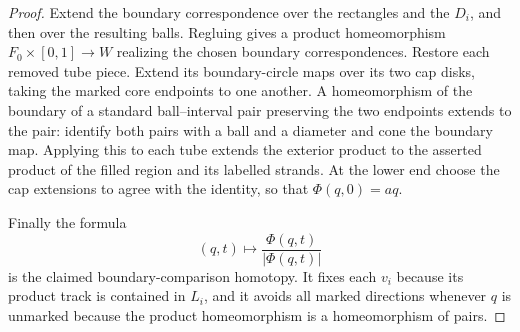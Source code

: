 \begin{proof}
Extend the boundary correspondence over the rectangles and the
$D_i$, and then over the resulting balls.  Regluing gives a product
homeomorphism $F_0\times[0,1]\to W$ realizing the chosen boundary
correspondences.  Restore each removed tube piece.  Extend its
boundary-circle maps over its two cap disks, taking the marked core
endpoints to one another.  A homeomorphism of the boundary of a
standard ball--interval pair preserving the two endpoints extends to
the pair: identify both pairs with a ball and a diameter and cone the
boundary map.  Applying this to each tube extends the exterior
product to the asserted product of the filled region and its labelled
strands.  At the lower end choose the cap extensions to agree with
the identity, so that $\Phi(q,0)=a q$.

Finally the formula
\[
 (q,t)\longmapsto\frac{\Phi(q,t)}{|\Phi(q,t)|}
\]
is the claimed boundary-comparison homotopy.  It fixes each $v_i$
because its product track is contained in $L_i$, and it avoids all
marked directions whenever $q$ is unmarked because the product
homeomorphism is a homeomorphism of pairs.
\end{proof}

